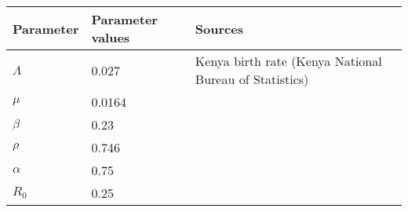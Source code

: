 \documentclass[12pt]{report}
\begin{document}
\begin{center}
	
	\begin{tabular}{|l|l|l|}
		\hline
		\textbf{Parameter} & \textbf{Parameter values} & \textbf{Sources}\\
		
		
		\hline$\Lambda$ &  \hspace{1.7cm}0.027 & Kenya birth rate (Kenya National Bureau of Statistics) \\
		\hline	$\mu$ & \hspace{1.7cm}0.0164 & \\
		\hline	$\beta$ & \hspace{1.7cm}0.23 &\\
		\hline	$\rho$ & \hspace{1.7cm}0.746 &\\
		\hline	$\alpha$ & \hspace{1.7cm}0.75 &\\
		\hline  $R_0$ & \hspace{1.7cm}0.25 & \\
		\hline
	\end{tabular}
\end{center}

	
\end{document}
